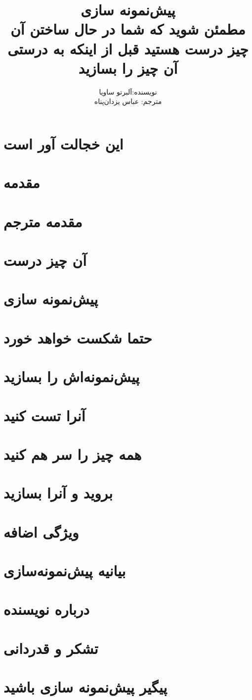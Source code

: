 \documentclass[a5paper,10pt]{book}
\author{نویسنده:آلبرتو ساویا
\\ مترجم: عباس یزدان‌پناه}
\title{پیش‌نمونه سازی
\\
مطمئن شوید که شما در حال ساختن  آن چیز درست هستید قبل از اینکه به درستی آن چیز را بسازید}
\begin{document}
\maketitle
\frontmatter
\tableofcontents

\chapter{این خجالت آور است}

\chapter{مقدمه}

\chapter{مقدمه مترجم}

\mainmatter
\chapter{آن چیز درست}

\chapter{پیش‌نمونه سازی}

\chapter{حتما شکست خواهد خورد}

\chapter{پیش‌نمونه‌اش را بسازید}

\chapter{‌آنرا تست کنید}

\chapter{همه چیز را سر هم کنید}

\chapter{بروید و آنرا بسازید}

\chapter{ویژگی اضافه}

\chapter{بیانیه پیش‌نمونه‌سازی}

\chapter{درباره نویسنده}

\chapter{تشکر و قدردانی}

\chapter{پیگیر پیش‌نمونه سازی باشید}

\end{document}
